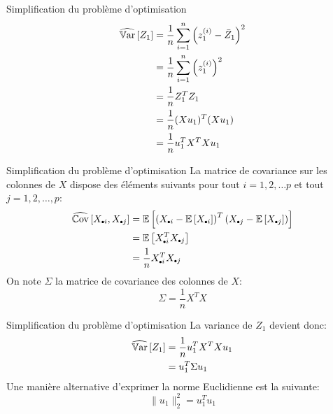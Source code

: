 \begin{frame}{Simplification du problème d'optimisation}
	\begin{equation}
		\begin{aligned}
			\widehat{\operatorname{\mathbb{V}ar}}\left[Z_1\right] 
			&= \frac{1}{n} \sum_{i=1}^n \left(z_1^{(i)} - \bar{Z}_1\right)^2 \\
			&= \frac{1}{n} \sum_{i=1}^n \left(z_1^{(i)}\right)^2 \\
			&= \frac{1}{n} Z_1^T Z_1 \\
			&= \frac{1}{n} (X u_1)^T (X u_1) \\
			&= \frac{1}{n} u_1^T X^T X u_1
		\end{aligned}
		\nonumber
	\end{equation}
\end{frame}

\begin{frame}{Simplification du problème d'optimisation}
	La matrice de covariance sur les colonnes de $X$ dispose des éléments suivants pour tout $i=1, 2, \dots p$ et tout $j=1, 2, \dots, p$:
	\begin{equation}
		\begin{aligned}
			\Covhat{X_{\bigdot i}, X_{\bigdot j}} 
			&= \E{\left(X_{\bigdot i} - \E{X_{\bigdot i}}\right)^T \left(X_{\bigdot j} - \E{X_{\bigdot j}}\right)} \\
			&= \E{X_{\bigdot i}^T X_{\bigdot j}} \\
			&= \frac{1}{n} X_{\bigdot i}^T X_{\bigdot j}
		\end{aligned}
		\nonumber
	\end{equation}
	\pause
	On note $\Sigma$ la matrice de covariance des colonnes de $X$:
	\begin{equation}
		\Sigma = \frac{1}{n} X^T X
		\nonumber
	\end{equation}
\end{frame}

\begin{frame}{Simplification du problème d'optimisation}
	La variance de $Z_1$ devient donc:
	\begin{equation}
		\begin{aligned}
			\widehat{\operatorname{\mathbb{V}ar}}\left[Z_1\right] 
			&= \frac{1}{n} u_1^T X^T X u_1 \\
			&= u_1^T \Sigma u_1
		\end{aligned}
		\nonumber
	\end{equation}	
	\pause
	Une manière alternative d'exprimer la norme Euclidienne est la suivante:
	\begin{equation}
		\|u_1\|_2^2 = u_1^T u_1
		\nonumber
	\end{equation}
\end{frame}

